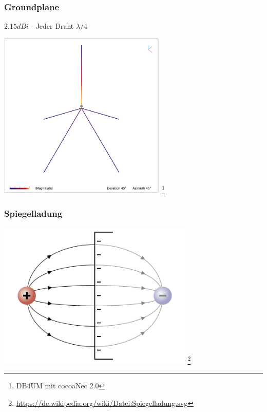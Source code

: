 \begin{frame}
    \frametitle{Groundplane}
    $2.15dBi$ - Jeder Draht $\lambda / 4$
    \begin{center}
        \includegraphics[width=0.6\textwidth]{e11/GP-DB4UM.png}
        \footnote{\tiny DB4UM mit cocoaNec 2.0}
	\end{center}
\end{frame}

\begin{frame}
    \frametitle{Spiegelladung}
    \begin{center}
        \includegraphics[width=0.7\textwidth]{e11/Spiegelladung.png}
                \footnote{\tiny \url{https://de.wikipedia.org/wiki/Datei:Spiegelladung.svg}}
	\end{center}
\end{frame}

